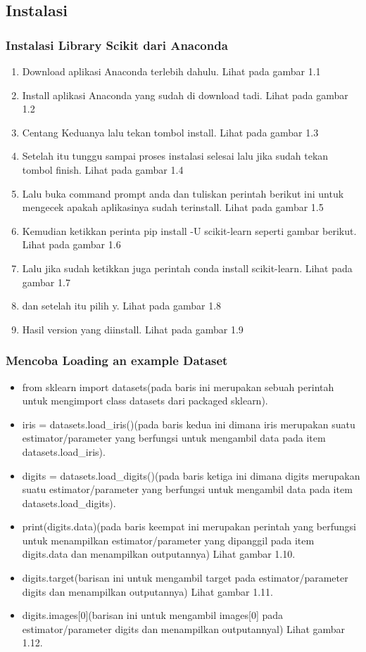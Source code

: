 \subsection{Instalasi}
\subsubsection{Instalasi Library Scikit dari Anaconda}
\begin{enumerate}
\item Download aplikasi Anaconda terlebih dahulu. Lihat pada gambar 1.1
\item Install aplikasi Anaconda yang sudah di download tadi. Lihat pada gambar 1.2
\item Centang Keduanya lalu tekan tombol install. Lihat pada gambar 1.3
\item Setelah itu tunggu sampai proses instalasi selesai lalu jika sudah tekan tombol finish. Lihat pada gambar 1.4
\item Lalu buka command prompt anda dan tuliskan perintah berikut ini untuk mengecek apakah aplikasinya sudah terinstall. Lihat pada gambar 1.5
\item Kemudian ketikkan perinta pip install -U scikit-learn seperti gambar berikut. Lihat pada gambar 1.6
\item Lalu jika sudah  ketikkan juga perintah conda install scikit-learn. Lihat pada gambar 1.7
\item dan setelah itu pilih y. Lihat pada gambar 1.8
\item Hasil version yang diinstall. Lihat pada gambar 1.9
\end{enumerate}
\subsubsection{Mencoba Loading an example Dataset}
\begin{itemize}
\item from sklearn import datasets(pada baris ini merupakan sebuah perintah untuk mengimport class datasets dari packaged sklearn).
\item iris = datasets.load\_iris()(pada baris kedua ini dimana iris merupakan suatu estimator/parameter yang berfungsi untuk mengambil data pada item datasets.load\_iris).
\item digits = datasets.load\_digits()(pada baris ketiga ini dimana digits merupakan suatu estimator/parameter yang berfungsi untuk mengambil data pada item datasets.load\_digits).
\item print(digits.data)(pada baris keempat ini merupakan perintah yang berfungsi untuk menampilkan estimator/parameter yang dipanggil pada item digits.data dan menampilkan outputannya) Lihat gambar 1.10.
\item digits.target(barisan ini untuk mengambil target pada estimator/parameter digits dan menampilkan outputannya) Lihat gambar 1.11.
\item digits.images[0](barisan ini untuk mengambil images[0] pada estimator/parameter digits dan menampilkan outputannyal) Lihat gambar 1.12.
\end{itemize}
